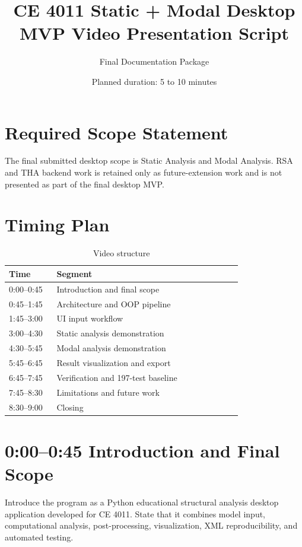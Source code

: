 \documentclass[11pt,a4paper]{article}
\title{\textbf{CE 4011 Static + Modal Desktop MVP Video Presentation Script}}
\author{Final Documentation Package}
\date{Planned duration: 5 to 10 minutes}
\begin{document}
\maketitle

\section{Required Scope Statement}

The final submitted desktop scope is Static Analysis and Modal Analysis. RSA and THA backend work is retained only as future-extension work and is not presented as part of the final desktop MVP.

\section{Timing Plan}

\begin{table}[htbp]
\centering
\caption{Video structure}
\begin{tabular}{p{0.18\linewidth}p{0.7\linewidth}}
\toprule
Time & Segment \\
\midrule
0:00--0:45 & Introduction and final scope \\
0:45--1:45 & Architecture and OOP pipeline \\
1:45--3:00 & UI input workflow \\
3:00--4:30 & Static analysis demonstration \\
4:30--5:45 & Modal analysis demonstration \\
5:45--6:45 & Result visualization and export \\
6:45--7:45 & Verification and 197-test baseline \\
7:45--8:30 & Limitations and future work \\
8:30--9:00 & Closing \\
\bottomrule
\end{tabular}
\end{table}

\section{0:00--0:45 Introduction and Final Scope}

Introduce the program as a Python educational structural analysis desktop application developed for CE 4011. State that it combines model input, computational analysis, post-processing, visualization, XML reproducibility, and automated testing.
\end{document}
